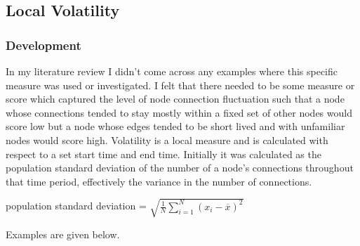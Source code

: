 



\subsection{Local Volatility}

\subsubsection{Development}
In my literature review I didn’t come across any examples where this specific measure was used or investigated. I felt that there needed to be some measure or score which captured the level of node connection fluctuation such that a node whose connections tended to stay mostly within a fixed set of other nodes would score low but a node whose edges tended to be short lived and with unfamiliar nodes would score high.
Volatility is a local measure and is calculated with respect to a set start time and end time. Initially it was calculated as the population standard deviation of the number of a node’s connections throughout that time period, effectively the variance in the number of connections.

\begin{center}
population standard deviation = $\sqrt{\frac{1}{N} \sum_{i=1}^N (x_i - \overline{x})^2}$
\end{center}

Examples are given below.


